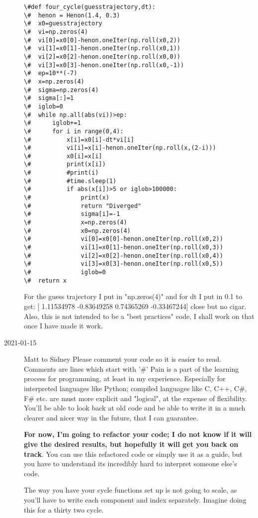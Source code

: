 \begin{description}
\begin{verbatim}
\#def four_cycle(guesstrajectory,dt):
\#  henon = Henon(1.4, 0.3)
\#  x0=guesstrajectory
\#  vi=np.zeros(4)
\#  vi[0]=x0[0]-henon.oneIter(np.roll(x0,2))
\#  vi[1]=x0[1]-henon.oneIter(np.roll(x0,1))
\#  vi[2]=x0[2]-henon.oneIter(np.roll(x0,0))
\#  vi[3]=x0[3]-henon.oneIter(np.roll(x0,-1))
\#  ep=10**(-7)
\#  x=np.zeros(4)
\#  sigma=np.zeros(4)
\#  sigma[:]=1
\#  iglob=0
\#  while np.all(abs(vi))>ep:
\#      iglob+=1
\#      for i in range(0,4):
\#          x[i]=x0[i]-dt*vi[i]
\#          vi[i]=x[i]-henon.oneIter(np.roll(x,(2-i)))
\#          x0[i]=x[i]
\#          print(x[i])
\#          #print(i)
\#          #time.sleep(1)
\#          if abs(x[i])>5 or iglob>100000:
\#              print(x)
\#              return "Diverged"
\#              sigma[i]=-1
\#              x=np.zeros(4)
\#              x0=np.zeros(4)
\#              vi[0]=x0[0]-henon.oneIter(np.roll(x0,2))
\#              vi[1]=x0[1]-henon.oneIter(np.roll(x0,3))
\#              vi[2]=x0[2]-henon.oneIter(np.roll(x0,4))
\#              vi[3]=x0[3]-henon.oneIter(np.roll(x0,5))
\#              iglob=0
\#  return x
\end{verbatim}
For the guess trajectory I put in "np.zeros(4)" and for dt I put in 0.1 to get: [ 1.11534978 -0.83649258  0.74365269 -0.33467244] close but no cigar. Also, this is not intended to be a "best practices" code, I shall work on that once I have made it work.

\item[2021-01-15] Matt to Sidney
{\color{red} Please comment your code so it is easier to read. Comments are lines which start with '\#'}
Pain is a part of the learning process for programming, at least in my experience. Especially for interpreted languages like Python;
compiled languages like C, C++, C\#, F\# etc. are must more explicit and "logical", at the expense of flexibility.
You'll be able to look back at old code and be able to write it
in a much clearer and nicer way in the future, that I can guarantee.

\textbf{For now, I'm going to refactor your code; I do not know if it will give the desired results, but hopefully it
will get you back on track}. You can use this refactored code or simply use it as a guide, but you have to understand
its incredibly hard to interpret someone else's code.

The way you have your cycle functions set up is not going to scale, as you'll have to write each
component and index separately. Imagine doing this for a thirty two cycle.


\end{description}

